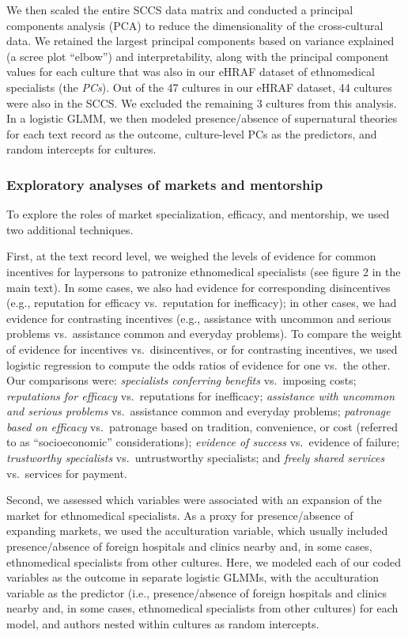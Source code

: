 \documentclass[
]{article}
\begin{document}
We then scaled the entire SCCS data matrix and conducted a principal components analysis (PCA) to reduce the dimensionality of the cross-cultural data. We retained the largest principal components based on variance explained (a scree plot ``elbow'') and interpretability, along with the principal component values for each culture that was also in our eHRAF dataset of ethnomedical specialists (the \emph{PCs}). Out of the 47 cultures in our eHRAF dataset, 44 cultures were also in the SCCS. We excluded the remaining 3 cultures from this analysis. In a logistic GLMM, we then modeled presence/absence of supernatural theories for each text record as the outcome, culture-level PCs as the predictors, and random intercepts for cultures.

\hypertarget{exploratory-analyses-of-markets-and-mentorship}{%
\subsubsection{Exploratory analyses of markets and mentorship}\label{exploratory-analyses-of-markets-and-mentorship}}

To explore the roles of market specialization, efficacy, and mentorship, we used two additional techniques.

First, at the text record level, we weighed the levels of evidence for common incentives for laypersons to patronize ethnomedical specialists (see figure 2 in the main text). In some cases, we also had evidence for corresponding disincentives (e.g., reputation for efficacy vs.~reputation for inefficacy); in other cases, we had evidence for contrasting incentives (e.g., assistance with uncommon and serious problems vs.~assistance common and everyday problems). To compare the weight of evidence for incentives vs.~disincentives, or for contrasting incentives, we used logistic regression to compute the odds ratios of evidence for one vs.~the other. Our comparisons were: \emph{specialists conferring benefits} vs.~imposing costs; \emph{reputations for efficacy} vs.~reputations for inefficacy; \emph{assistance with uncommon and serious problems} vs.~assistance common and everyday problems; \emph{patronage based on efficacy} vs.~patronage based on tradition, convenience, or cost (referred to as ``socioeconomic'' considerations); \emph{evidence of success} vs.~evidence of failure; \emph{trustworthy specialists} vs.~untrustworthy specialists; and \emph{freely shared services} vs.~services for payment.

Second, we assessed which variables were associated with an expansion of the market for ethnomedical specialists. As a proxy for presence/absence of expanding markets, we used the acculturation variable, which usually included presence/absence of foreign hospitals and clinics nearby and, in some cases, ethnomedical specialists from other cultures. Here, we modeled each of our coded variables as the outcome in separate logistic GLMMs, with the acculturation variable as the predictor (i.e., presence/absence of foreign hospitals and clinics nearby and, in some cases, ethnomedical specialists from other cultures) for each model, and authors nested within cultures as random intercepts.
\end{document}
